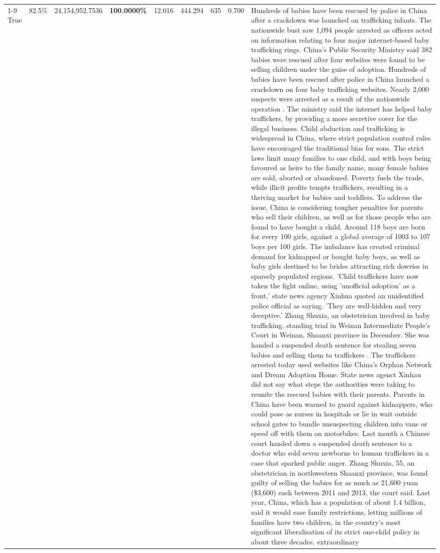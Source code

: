 \begin{table}[H]
\begin{tabular}{lllrlllll}
\cline{1-9}
True & 82.5\% & 24,154,952.7536 & \bfseries \color{red} 100.0000\% & 12.016 & 444.294 & 635 & 0.700 & Hundreds of babies have been rescued by police in China after a crackdown was launched on trafficking infants. The nationwide bust saw 1,094 people arrested as officers acted on information relating to four major internet-based baby trafficking rings. China's Public Security Ministry said 382 babies were rescued after four websites were found to be selling children under the guise of adoption. Hundreds of babies have been rescued after police in China launched a crackdown on four baby trafficking websites. Nearly 2,000 suspects were arrested as a result of the nationwide operation . The ministry said the internet has helped baby traffickers, by providing a more secretive cover for the illegal business. Child abduction and trafficking is widespread in China, where strict population control rules have encouraged the traditional bias for sons. The strict laws limit many families to one child, and with boys being favoured as heirs to the family name, many female babies are sold, aborted or abandoned. Poverty fuels the trade, while illicit profits tempts traffickers, resulting in a thriving market for babies and toddlers. To address the issue, China is considering tougher penalties for parents who sell their children, as well as for those people who are found to have bought a child. Around 118 boys are born for every 100 girls, against a global average of 1003 to 107 boys per 100 girls. The imbalance has created criminal demand for kidnapped or bought baby boys, as well as baby girls destined to be brides attracting rich dowries in sparsely populated regions. 'Child traffickers have now taken the fight online, using 'unofficial adoption' as a front,' state news agency Xinhua quoted an unidentified police official as saying. 'They are well-hidden and very deceptive.' Zhang Shuxia, an obstetrician involved in baby trafficking, standing trial in Weinan Intermediate People's Court in Weinan, Shaanxi province in December. She was handed a suspended death sentence for stealing seven babies and selling them to traffickers . The traffickers arrested today used websites like China's Orphan Network and Dream Adoption Home. State news agenct Xinhau did not say what steps the authorities were taking to reunite the rescued babies with their parents. Parents in China have been warned to guard against kidnappers, who could pose as nurses in hospitals or lie in wait outside school gates to bundle unsuspecting children into vans or speed off with them on motorbikes. Last month a Chinese court handed down a suspended death sentence to a doctor who sold seven newborns to human traffickers in a case that sparked public anger. Zhang Shuxia, 55, an obstetrician in northwestern Shaanxi province, was found guilty of selling the babies for as much as 21,600 yuan (\$3,600) each between 2011 and 2013, the court said. Last year, China, which has a population of about 1.4 billion, said it would ease family restrictions, letting millions of families have two children, in the country's most significant liberalisation of its strict one-child policy in about three decades. extraordinary \\

\end{tabular}
\end{table}
